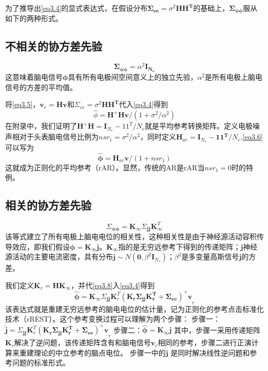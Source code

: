 为了推导出\eqref{eq3.4}的显式表达式，在假设分布$\mathbf{\Sigma_{ee}}=\sigma^{2}\mathbf{HH^T}$的基础上，$\mathbf{\Sigma_{\phi\phi}}$服从如下的两种形式。
\subsection{不相关的协方差先验}
\begin{equation}\label{eq3.5}
\mathbf{\Sigma_{\phi\phi}}=\alpha^{2}\mathbf{I_{N_{e}}}
\end{equation}
这意味着脑电信号$\mathbf{\phi}$具有所有电极间空间意义上的独立先验，$\alpha^{2}$是所有电极上脑电信号的方差的平均值。

将\eqref{eq3.5}，$\mathbf{v}_{r}=\mathbf{Hv}$和$\Sigma_{ee}=\sigma^{2}\mathbf{HH^{T}}$代入\eqref{eq3.4}得到
\begin{equation}\label{eq3.6}
\hat{\phi}=\mathbf{H^{+}Hv}/(1+\sigma^{2}/{\alpha^{2}})
\end{equation}
在附录中，我们证明了$\mathbf{H^+H}=\mathbf{I}_{N_e}-11^T/N_e$就是平均参考转换矩阵。定义电极噪声相对于头表脑电信号比例为$nsr_1=\sigma^2/\alpha^2$，同时定义$\mathbf{H}_{ar}=\mathbf{I}_{N_e}-\mathbf{11^T}/{N_e}$,\eqref{eq3.6}可以写为
\begin{equation}\label{eq3.7}
\hat{\mathbf{\phi}}=\mathbf{H}_{ar}\mathbf{v}/(1+nsr_1)
\end{equation}
这就成为正则化的平均参考（rAR）。显然，传统的AR是rAR当$nsr_1=0$时的特例。
\subsection{相关的协方差先验}
\begin{equation}\label{eq3.8}
\Sigma_{\mathbf{\phi\phi}}=\mathbf{K}_{\infty}\Sigma_{\mathbf{jj}}\mathbf{K}_{\infty}^T
\end{equation}
该等式建立了所有电极上脑电电位的相关性，这种相关性是由于神经源活动容积传导效应，即我们假设$\mathbf{\phi}=\mathbf{K}_{\infty}\mathbf{j}$。$\mathbf{K}_\infty$指的是无穷远参考下得到的传递矩阵；$\mathbf{j}$神经源活动的主要电流密度，具有分布$\mathbf{j}\sim{N(\mathbf{0},\beta^2\mathbf{I}_{N_s})}$；$\beta^{2}$是多变量高斯信号$\mathbf{j}$的方差。

我们定义$\mathbf{K}_{r}=\mathbf{HK}_{\infty}$，并代\eqref{eq3.8}入\eqref{eq3.4}得到
\begin{equation}\label{eq3.9}
\hat{\mathbf{\phi}}=\mathbf{K}_{\infty}\Sigma_{\mathbf{jj}}\mathbf{K}_{r}^{T}\mathbf{(\mathbf{K}_{r}\Sigma_{\mathbf{jj}}\mathbf{K}_{r}^{T}+\Sigma_{ee})^{+}v}_{r}
\end{equation}
该表达式就是重建无穷远参考的脑电电位的估计量，记为正则化的参考点击标准化技术（rREST）。这个参考变换过程可以理解为两个步骤：
步骤一：$\hat{\mathbf{j}}=\Sigma_{\mathbf{jj}}\mathbf{K}_{r}^{T}\mathbf{(\mathbf{K}_{r}\Sigma_{\mathbf{jj}}\mathbf{K}_{r}^{T}+\Sigma_{ee})^{+}v}_{r}$
步骤二：$\hat{\mathbf{\phi}}=\mathbf{K}_{\infty}\mathbf{j}$
其中，步骤一采用传递矩阵$\mathbf{K}_{r}$解决了逆问题，该传递矩阵含有和脑电信号$\mathbf{v}_{r}$相同的参考，步骤二进行正演计算来重建理论的中立参考的脑点电位。 步骤一中的$\hat{\mathbf{j}}$ 是同时解决线性逆问题和参考问题的标准形式。

